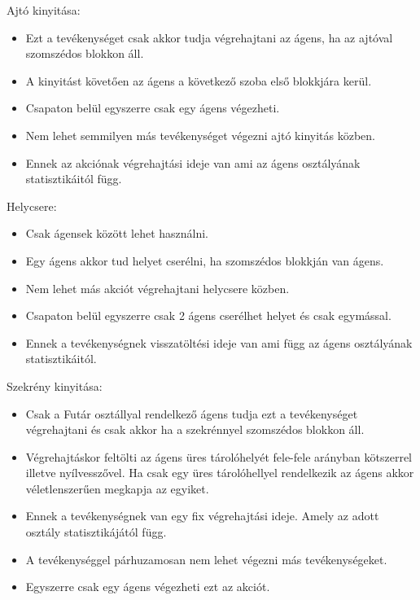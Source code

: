 Ajtó kinyitása:

\begin{itemize}
\item Ezt a tevékenységet csak akkor tudja végrehajtani az ágens, ha az ajtóval szomszédos blokkon áll.
\item A kinyitást követően az ágens a következő szoba első blokkjára kerül.
\item Csapaton belül egyszerre csak egy ágens végezheti.
\item Nem lehet semmilyen más tevékenységet végezni ajtó kinyitás közben.
\item Ennek az akciónak végrehajtási ideje van ami az ágens osztályának statisztikáitól függ.
 
\end{itemize}

Helycsere:

\begin{itemize}
\item Csak ágensek között lehet használni.
\item Egy ágens akkor tud helyet cserélni, ha szomszédos blokkján van ágens.
\item Nem lehet más akciót végrehajtani helycsere közben.
\item Csapaton belül egyszerre csak 2 ágens cserélhet helyet és csak egymással.
\item Ennek a tevékenységnek visszatöltési ideje van ami függ az ágens osztályának statisztikáitól.
\end{itemize}

Szekrény kinyitása:

\begin{itemize}
\item Csak a Futár osztállyal rendelkező ágens tudja ezt a tevékenységet végrehajtani és csak akkor ha a szekrénnyel szomszédos blokkon áll.
\item Végrehajtáskor feltölti az ágens üres tárolóhelyét fele-fele arányban kötszerrel illetve nyílvesszővel. Ha csak egy üres tárolóhellyel rendelkezik az ágens akkor véletlenszerűen megkapja az egyiket.
\item Ennek a tevékenységnek van egy fix végrehajtási ideje. Amely az adott osztály statisztikájától függ.
\item A tevékenységgel párhuzamosan nem lehet végezni más tevékenységeket.
\item Egyszerre csak egy ágens végezheti ezt az akciót.
\end{itemize}

